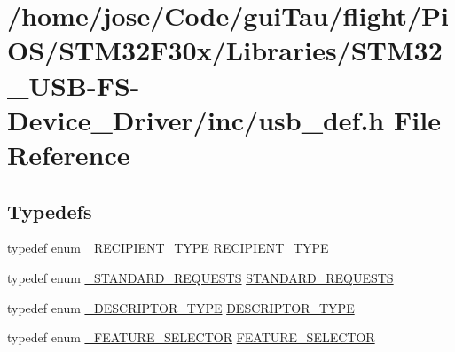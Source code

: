 \hypertarget{_s_t_m32_f30x_2_libraries_2_s_t_m32___u_s_b-_f_s-_device___driver_2inc_2usb__def_8h}{\section{/home/jose/\-Code/gui\-Tau/flight/\-Pi\-O\-S/\-S\-T\-M32\-F30x/\-Libraries/\-S\-T\-M32\-\_\-\-U\-S\-B-\/\-F\-S-\/\-Device\-\_\-\-Driver/inc/usb\-\_\-def.h File Reference}
\label{_s_t_m32_f30x_2_libraries_2_s_t_m32___u_s_b-_f_s-_device___driver_2inc_2usb__def_8h}
}
\subsection*{Typedefs}
\begin{DoxyCompactItemize}
\item 
typedef enum \hyperlink{_s_t_m32_f10x_2_libraries_2_s_t_m32___u_s_b-_f_s-_device___driver_2inc_2usb__def_8h_a772ce5a2cb37e07e7afe0cc5f5621efd}{\-\_\-\-R\-E\-C\-I\-P\-I\-E\-N\-T\-\_\-\-T\-Y\-P\-E} \hyperlink{_s_t_m32_f30x_2_libraries_2_s_t_m32___u_s_b-_f_s-_device___driver_2inc_2usb__def_8h_a9afe406f27f4d7e165be4ca601acb857}{R\-E\-C\-I\-P\-I\-E\-N\-T\-\_\-\-T\-Y\-P\-E}
\item 
typedef enum \hyperlink{_s_t_m32_f10x_2_libraries_2_s_t_m32___u_s_b-_f_s-_device___driver_2inc_2usb__def_8h_afe5511beefa80c0048acf5a493edebfc}{\-\_\-\-S\-T\-A\-N\-D\-A\-R\-D\-\_\-\-R\-E\-Q\-U\-E\-S\-T\-S} \hyperlink{_s_t_m32_f30x_2_libraries_2_s_t_m32___u_s_b-_f_s-_device___driver_2inc_2usb__def_8h_ac2c5dbb6be2fcddb0a0f6e2d909903bd}{S\-T\-A\-N\-D\-A\-R\-D\-\_\-\-R\-E\-Q\-U\-E\-S\-T\-S}
\item 
typedef enum \hyperlink{_s_t_m32_f10x_2_libraries_2_s_t_m32___u_s_b-_f_s-_device___driver_2inc_2usb__def_8h_a623e86b3f52ec5899f47f87a5ceb558a}{\-\_\-\-D\-E\-S\-C\-R\-I\-P\-T\-O\-R\-\_\-\-T\-Y\-P\-E} \hyperlink{_s_t_m32_f30x_2_libraries_2_s_t_m32___u_s_b-_f_s-_device___driver_2inc_2usb__def_8h_aa5ecce547a81dd6ff168f386597d5e0b}{D\-E\-S\-C\-R\-I\-P\-T\-O\-R\-\_\-\-T\-Y\-P\-E}
\item 
typedef enum \hyperlink{_s_t_m32_f10x_2_libraries_2_s_t_m32___u_s_b-_f_s-_device___driver_2inc_2usb__def_8h_a5018c8948e057aaabfbf7c3da6fc23b3}{\-\_\-\-F\-E\-A\-T\-U\-R\-E\-\_\-\-S\-E\-L\-E\-C\-T\-O\-R} \hyperlink{_s_t_m32_f30x_2_libraries_2_s_t_m32___u_s_b-_f_s-_device___driver_2inc_2usb__def_8h_a0a9652fff1d6a867af1d7c9d12edc2ee}{F\-E\-A\-T\-U\-R\-E\-\_\-\-S\-E\-L\-E\-C\-T\-O\-R}
\end{DoxyCompactItemize}
